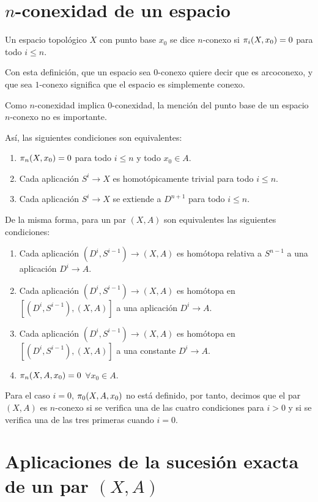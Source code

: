 \section{$n$-conexidad de un espacio}
\begin{defin}
Un espacio topológico $X$ con punto base $x_0$ se dice $n$-conexo si $\pi_{i}(X, x_0) = 0$ para todo $i \leq n$.
\end{defin}
Con esta definición, que un espacio sea $0$-conexo quiere decir que es arcoconexo, y que sea $1$-conexo significa que el espacio es simplemente conexo. \par
Como $n$-conexidad implica $0$-conexidad, la mención del punto base de un espacio $n$-conexo no es importante. \par
Así, las siguientes condiciones son equivalentes:
\begin{enumerate}
\item $\pi_{n}(X, x_0) = 0$ para todo $i \leq n$ y todo $x_0 \in A$.
\item Cada aplicación $S^i \longrightarrow X$ es homotópicamente trivial para todo $i \leq n$.
\item Cada aplicación $S^i \longrightarrow X$ se extiende a $D^{n+1}$ para todo $i \leq n$.
\end{enumerate}
De la misma forma, para un par $(X, A)$ son equivalentes las siguientes condiciones:
\begin{enumerate}
\item Cada aplicación $(D^i, S^{i-1}) \longrightarrow (X, A)$ es homótopa relativa a $S^{n-1}$ a una aplicación $D^i \longrightarrow A$.
\item Cada aplicación $(D^i, S^{i-1}) \longrightarrow (X, A)$ es homótopa en $[(D^i, S^{i-1}), (X, A)]$ a una aplicación $D^i \longrightarrow A$.
\item Cada aplicación $(D^i, S^{i-1}) \longrightarrow (X, A)$ es homótopa en $[(D^i, S^{i-1}), (X, A)]$ a una constante $D^i \longrightarrow A$.
\item $\pi_{n}(X, A, x_0) = 0$ $\forall x_0 \in A$.
\end{enumerate}
Para el caso $i = 0$, $\pi_{0}(X, A, x_0)$ no está definido, por tanto, decimos que el par $(X, A)$ es $n$-conexo si se verifica una de las cuatro condiciones para $i > 0$ y si se verifica una de las tres primeras cuando $i=0$.

\section{Aplicaciones de la sucesión exacta de un par $(X,A)$}

